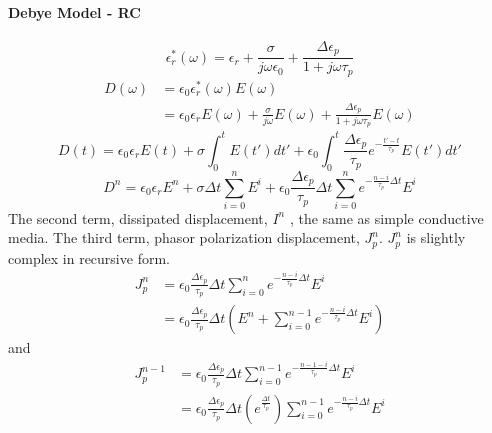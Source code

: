 \paragraph{{\msjh Debye Model - RC}}
\begin{displaymath}
  \epsilon_r^*(\omega) = \epsilon_r + \frac{\sigma}{j\omega \epsilon_0} + \frac{\Delta \epsilon_p}{1+j\omega \tau_p}
\end{displaymath}
\begin{displaymath}
  \begin{split}
    D(\omega) & = \epsilon_0 \epsilon_r^*(\omega) E(\omega)\\
    & = \epsilon_0 \epsilon_r E(\omega) + \frac{\sigma}{j\omega} E(\omega) + \frac{\Delta \epsilon_p}{1+j\omega \tau_p}E(\omega)
  \end{split}
\end{displaymath}
\begin{displaymath}
  D(t) = \epsilon_0 \epsilon_r E(t) + \sigma \int_0^t E(t')dt' + \epsilon_0 \int_0^t \frac{\Delta \epsilon_p}{\tau_p}e^{-\frac{t'-t}{\tau_p}}E(t')dt'
\end{displaymath}
\begin{equation}
  D^n = \epsilon_0 \epsilon_rE^n + \sigma \Delta t \sum_{i=0}^{n}E^i + \epsilon_0 \frac{\Delta \epsilon_p}{\tau_p}\Delta t \sum_{i=0}^{n} e^{-\frac{n-i}{\tau_p}\Delta t} E^i
\end{equation}
The second term, dissipated displacement, $I^n$ , the same as simple conductive media.
The third term, phasor polarization displacement, $J_p^n$. $J_p^n$ is slightly complex in recursive form.
\begin{equation}
  \begin{split}
    J_p^n & = \epsilon_0\frac{\Delta\epsilon_p}{\tau_p}\Delta t \sum_{i=0}^ne^{-\frac{n-i}{\tau_p}\Delta t}E^i\\
    & = \epsilon_0\frac{\Delta\epsilon_p}{\tau_p}\Delta t \left( E^n + \sum_{i=0}^{n-1}e^{-\frac{n-i}{\tau_p}\Delta t}E^i\right)
  \end{split}
\end{equation}
and 
\begin{equation}
  \begin{split}
    J_p^{n-1} & = \epsilon_0\frac{\Delta\epsilon_p}{\tau_p}\Delta t \sum_{i=0}^{n-1}e^{-\frac{n-1-i}{\tau_p}\Delta t}E^i\\
    & = \epsilon_0\frac{\Delta\epsilon_p}{\tau_p}\Delta t \left( e^{\frac{\Delta t}{\tau_p}} \right) \sum_{i=0}^{n-1}e^{-\frac{n-i}{\tau_p}\Delta t}E^i
  \end{split}
\end{equation}
